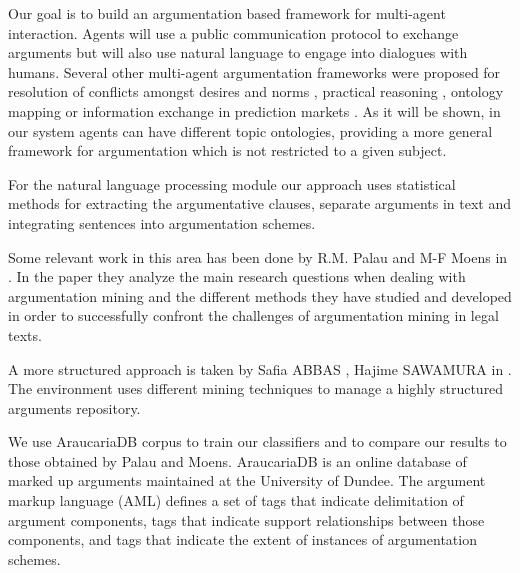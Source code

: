 \par
Our goal is to build an argumentation based framework for multi-agent interaction. Agents will use a public communication protocol to exchange arguments but will also use natural language to engage into dialogues with humans. Several other multi-agent argumentation frameworks were proposed for resolution of conflicts amongst desires and norms \cite{modgil2009argumentation}, practical reasoning \cite{amgoud2009constrained}, ontology mapping \cite{trojahn2009argumentation} or information exchange in prediction markets \cite{ontañón2009argumentation}. As it will be shown, in our system agents can have different topic ontologies, providing a more general framework for argumentation which is not restricted to a given subject.
\par
For the natural language processing module our approach uses statistical methods for extracting the argumentative clauses, separate arguments in text and integrating sentences into argumentation schemes.
\par
Some relevant work in this area has been done by R.M. Palau and M-F Moens in \cite{Palau}. In the paper they analyze the main research questions when dealing with argumentation mining and the different methods they have studied and developed in order to successfully confront the challenges of argumentation mining in legal texts.
\par
A more structured approach is taken by Safia ABBAS , Hajime SAWAMURA in \cite{abbas-ales}. The environment uses different mining techniques to manage a highly structured arguments repository.
\par
We use AraucariaDB corpus to train our classifiers and to compare our results to those obtained by Palau and Moens. AraucariaDB is an online database of marked up arguments maintained at the University of Dundee. The argument markup language (AML) \cite{reed2004araucaria} defines a set of tags that indicate delimitation of argument components, tags that indicate support relationships between those components, and tags that indicate the extent of instances of argumentation schemes.
